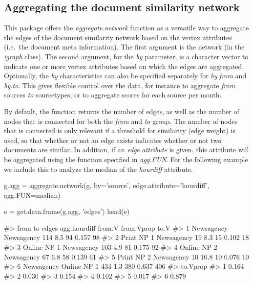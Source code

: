 \subsection{Aggregating the document similarity network}

This package offers the \emph{aggregate.network} function as a versatile
way to aggregate the edges of the document similarity network based on
the vertex attributes (i.e.~the document meta information). The first
argument is the network (in the \emph{igraph} class). The second
argument, for the \emph{by} parameter, is a character vector to indicate
one or more vertex attributes based on which the edges are aggregated.
Optionally, the \emph{by} characteristics can also be specified
separately for \emph{by.from} and \emph{by.to}. This gives flexible
control over the data, for instance to aggregate \emph{from} sources
\emph{to} sourcetypes, or to aggregate scores for each source per month.

By default, the function returns the number of edges, as well as the
number of nodes that is connected for both the \emph{from} and \emph{to}
group. The number of nodes that is connected is only relevant if a
threshold for similarity (edge weight) is used, so that whether or not
an edge exists indicates whether or not two documents are similar. In
addition, if an \emph{edge.attribute} is given, this attribute will be
aggregated using the function specified in \emph{agg.FUN}. For the
following example we include this to analyze the median of the
\emph{hourdiff} attribute.

\begin{Schunk}
\begin{Sinput}
g.agg = aggregate.network(g, by='source', edge.attribute='hourdiff', agg.FUN=median)

e = get.data.frame(g.agg, 'edges')
head(e)
\end{Sinput}
\begin{Soutput}
#>          from          to edges agg.hourdiff from.V from.Vprop to.V
#> 1  Newsagency  Newsagency   114          8.5     94      0.157   98
#> 2  Print NP 1  Newsagency    19          8.3     15      0.102   18
#> 3 Online NP 1  Newsagency   103          4.9     81      0.175   92
#> 4 Online NP 2  Newsagency    67          6.8     58      0.139   61
#> 5  Print NP 2  Newsagency    10         10.8     10      0.076   10
#> 6  Newsagency Online NP 1   434          1.3    380      0.637  406
#>   to.Vprop
#> 1    0.164
#> 2    0.030
#> 3    0.154
#> 4    0.102
#> 5    0.017
#> 6    0.879
\end{Soutput}
\end{Schunk}


